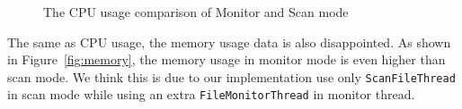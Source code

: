 \begin{figure}
\caption{The CPU usage comparison of Monitor and Scan mode}
\label{fig:cpu}
\end{figure}

The same as CPU usage, the memory usage data is also disappointed. As shown in Figure~\ref{fig:memory}, the memory usage in 
monitor mode is even higher than scan mode. We think this is due to our implementation use only \verb+ScanFileThread+ in 
scan mode while using an extra \verb+FileMonitorThread+ in monitor thread. 

\begin{figure}%
\centering
{}
\hspace{0.20in}

\end{figure}
